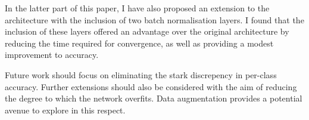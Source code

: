 \documentclass[conference]{IEEEtran}
\begin{document}
In the latter part of this paper, I have also proposed an extension to the architecture with the inclusion of two batch normalisation layers.
I found that the inclusion of these layers offered an advantage over the original architecture by reducing the time required for convergence, as well as providing a modest improvement to accuracy.

Future work should focus on eliminating the stark discrepency in per-class accuracy.
Further extensions should also be considered with the aim of reducing the degree to which the network overfits.
Data augmentation provides a potential avenue to explore in this respect.



\end{document}
